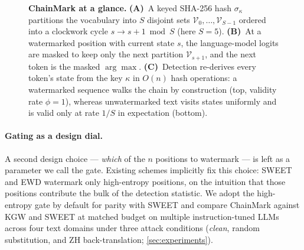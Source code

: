 \begin{figure}[t]
  \caption{\textbf{ChainMark at a glance.}
    \textbf{(A)}~A keyed SHA-256 hash $\sigma_\kappa$ partitions the
    vocabulary into $S$ disjoint sets $\mathcal V_0, \dots,
    \mathcal V_{S-1}$ ordered into a clockwork cycle
    $s \to s{+}1 \bmod S$ (here $S{=}5$).
    \textbf{(B)}~At a watermarked position with current state $s$,
    the language-model logits are masked to keep only the next
    partition $\mathcal V_{s+1}$, and the next token is the masked
    $\arg\max$.
    \textbf{(C)}~Detection re-derives every token's state from the
    key $\kappa$ in $O(n)$ hash operations: a watermarked sequence walks
    the chain by construction (top, validity rate $\phi=1$), whereas
    unwatermarked text visits states uniformly and is valid only at
    rate $1/S$ in expectation (bottom).}
  \label{fig:teaser}
\end{figure}

\paragraph{Gating as a design dial.}
A second design choice — \emph{which} of the $n$ positions to
watermark — is left as a parameter we call the gate. Existing
schemes implicitly fix this choice: SWEET and EWD watermark only
high-entropy positions, on the intuition that those positions
contribute the bulk of the detection statistic. We adopt the
high-entropy gate by default for parity with SWEET and compare ChainMark
against KGW and SWEET at matched budget on multiple
instruction-tuned LLMs across four text domains under three attack
conditions (\emph{clean}, random substitution, and ZH
back-translation; \autoref{sec:experiments}).


